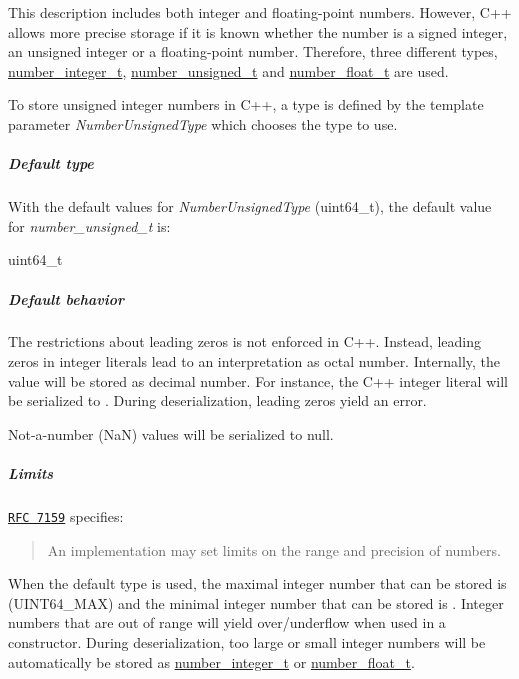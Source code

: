 This description includes both integer and floating-\/point numbers. However, C++ allows more precise storage if it is known whether the number is a signed integer, an unsigned integer or a floating-\/point number. Therefore, three different types, \hyperlink{classnlohmann_1_1basic__json_ac4b10b2364f26ce47bdb9a413ff04a59}{number\-\_\-integer\-\_\-t}, \hyperlink{classnlohmann_1_1basic__json_a60a04166c122072ab11eaf9845d9cd1d}{number\-\_\-unsigned\-\_\-t} and \hyperlink{classnlohmann_1_1basic__json_a74a0013e847fdc574b48f931f0e757e1}{number\-\_\-float\-\_\-t} are used.

To store unsigned integer numbers in C++, a type is defined by the template parameter {\itshape Number\-Unsigned\-Type} which chooses the type to use.

\subparagraph*{Default type}

With the default values for {\itshape Number\-Unsigned\-Type} ({\ttfamily uint64\-\_\-t}), the default value for {\itshape number\-\_\-unsigned\-\_\-t} is\-:


\begin{DoxyCode}
uint64\_t
\end{DoxyCode}


\subparagraph*{Default behavior}


\begin{DoxyItemize}
\item The restrictions about leading zeros is not enforced in C++. Instead, leading zeros in integer literals lead to an interpretation as octal number. Internally, the value will be stored as decimal number. For instance, the C++ integer literal {} will be serialized to {}. During deserialization, leading zeros yield an error.
\item Not-\/a-\/number (Na\-N) values will be serialized to {\ttfamily null}.
\end{DoxyItemize}

\subparagraph*{Limits}

\href{http://rfc7159.net/rfc7159}{\tt R\-F\-C 7159} specifies\-: \begin{quotation}
An implementation may set limits on the range and precision of numbers.

\end{quotation}


When the default type is used, the maximal integer number that can be stored is {} (U\-I\-N\-T64\-\_\-\-M\-A\-X) and the minimal integer number that can be stored is {}. Integer numbers that are out of range will yield over/underflow when used in a constructor. During deserialization, too large or small integer numbers will be automatically be stored as \hyperlink{classnlohmann_1_1basic__json_ac4b10b2364f26ce47bdb9a413ff04a59}{number\-\_\-integer\-\_\-t} or \hyperlink{classnlohmann_1_1basic__json_a74a0013e847fdc574b48f931f0e757e1}{number\-\_\-float\-\_\-t}.

